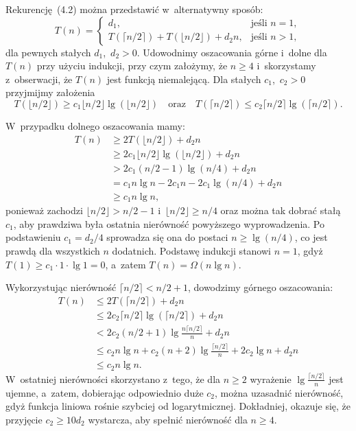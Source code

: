 \exercise %
Rekurencję~(4.2) można przedstawić w~alternatywny sposób:
\[
	T(n) =
	\begin{cases}
		d_1, & \text{jeśli $n=1$}, \\
		T(\lceil n/2\rceil)+T(\lfloor n/2\rfloor)+d_2n, & \text{jeśli $n>1$},
	\end{cases}
\]
dla pewnych stałych $d_1$,~$d_2>0$. Udowodnimy oszacowania górne i~dolne dla $T(n)$ przy użyciu indukcji, przy czym założymy, że $n\ge4$ i~skorzystamy z~obserwacji, że $T(n)$ jest funkcją niemalejącą. Dla stałych $c_1$,~$c_2>0$ przyjmijmy założenia
\[
	T(\lfloor n/2\rfloor) \ge c_1\lfloor n/2\rfloor\lg(\lfloor n/2\rfloor) \quad\text{oraz}\quad T(\lceil n/2\rceil) \le c_2\lceil n/2\rceil\lg(\lceil n/2\rceil).
\]

W~przypadku dolnego oszacowania mamy:
\begin{align*}
	T(n) &\ge 2T(\lfloor n/2\rfloor)+d_2n \\
	&\ge 2c_1\lfloor n/2\rfloor\lg(\lfloor n/2\rfloor)+d_2n \\
	&> 2c_1(n/2-1)\lg(n/4)+d_2n \\
	&= c_1n\lg n-2c_1n-2c_1\!\lg(n/4)+d_2n \\
	&\ge c_1n\lg n,
\end{align*}
ponieważ zachodzi $\lfloor n/2\rfloor>n/2-1$ i~$\lfloor n/2\rfloor\ge n/4$ oraz można tak dobrać stałą $c_1$, aby prawdziwa była ostatnia nierówność powyższego wyprowadzenia. Po podstawieniu $c_1=d_2/4$ sprowadza się ona do postaci $n\ge\lg(n/4)$, co jest prawdą dla wszystkich $n$ dodatnich. Podstawę indukcji stanowi $n=1$, gdyż $T(1)\ge c_1\cdot 1\cdot\lg1=0$, a~zatem $T(n)=\Omega(n\lg n)$.

Wykorzystując nierówność $\lceil n/2\rceil<n/2+1$, dowodzimy górnego oszacowania:
\begin{align*}
	T(n) &\le 2T(\lceil n/2\rceil)+d_2n \\
	&\le 2c_2\lceil n/2\rceil\lg(\lceil n/2\rceil)+d_2n \\
	&< 2c_2(n/2+1)\lg\frac{n\lceil n/2\rceil}{n}+d_2n \\
	&\le c_2n\lg n+c_2(n+2)\lg\frac{\lceil n/2\rceil}{n}+2c_2\lg n+d_2n \\
	&\le c_2n\lg n.
\end{align*}
W~ostatniej nierówności skorzystano z~tego, że dla $n\ge2$ wyrażenie $\lg\frac{\lceil n/2\rceil}{n}$ jest ujemne, a~zatem, dobierając odpowiednio duże $c_2$, można uzasadnić nierówność, gdyż funkcja liniowa rośnie szybciej od logarytmicznej. Dokładniej, okazuje się, że przyjęcie $c_2\ge10d_2$ wystarcza, aby spełnić nierówność dla $n\ge4$.


